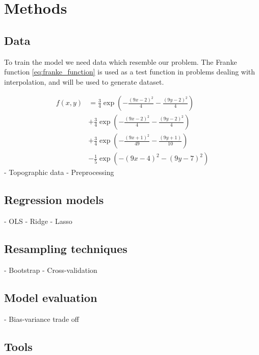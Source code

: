 \section{Methods}\label{sec:methods}

\subsection{Data}\label{ssec:data}
To train the model we need data which resemble our problem. The Franke function \eqref{eq:franke_function} is used as a test function in problems dealing with interpolation, and will be used to generate dataset. 

\begin{equation}\label{eq:franke_function}
\begin{split}
    f(x, y) &= \frac{3}{4} \exp(- \frac{(9x-2)^{2}}{4} - \frac{(9y-2)^{2}}{4} ) \\
    &+ \frac{3}{4} \exp(- \frac{(9x-2)^{2}}{4} - \frac{(9y-2)^{2}}{4} ) \\
    &+ \frac{3}{4} \exp(- \frac{(9x+1)^{2}}{49} - \frac{(9y+1)}{10} ) \\ 
    &- \frac{1}{5} \exp(- (9x-4)^{2} - (9y-7)^{2} ) 
\end{split}
\end{equation}
- Topographic data
- Preprocessing


\subsection{Regression models}\label{ssec:regression_models}
- OLS
- Ridge
- Lasso

\subsection{Resampling techniques}\label{ssec:resampling_techniques}
- Bootstrap
- Cross-validation

\subsection{Model evaluation}\label{ssec:evaluation}
- Bias-variance trade off


\subsection{Tools}\label{ssec:tools}